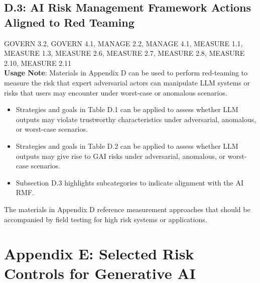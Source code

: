 \documentclass[fleqn]{article}
\begin{document}
\subsection*{D.3: AI Risk Management Framework Actions Aligned to Red Teaming}\label{sec:appndxd3}

GOVERN 3.2, GOVERN 4.1, MANAGE 2.2, MANAGE 4.1, MEASURE 1.1, MEASURE 1.3, MEASURE 2.6, MEASURE 2.7, MEASURE 2.8, MEASURE 2.10, MEASURE 2.11 \\

\noindent\textbf{Usage Note}: Materials in Appendix D can be used to perform red-teaming to measure the risk that expert adversarial actors can manipulate LLM systems or risks that users may encounter under worst-case or anomalous scenarios. 

\begin{itemize}
	\item Strategies and goals in Table D.1 can be applied to assess whether LLM outputs may violate trustworthy characteristics under adversarial, anomalous, or worst-case scenarios.   
	\item Strategies and goals in Table D.2 can be applied to assess whether LLM outputs may give rise to GAI risks under adversarial, anomalous, or worst-case scenarios.
	\item Subsection D.3 highlights subcategories to indicate alignment with the AI RMF.   
\end{itemize}

\noindent The materials in Appendix D reference measurement approaches that should be accompanied by field testing for high risk systems or applications.  

\pagebreak

\section*{Appendix E: Selected Risk Controls for Generative AI}\label{sec:appndxe}
\end{document}
